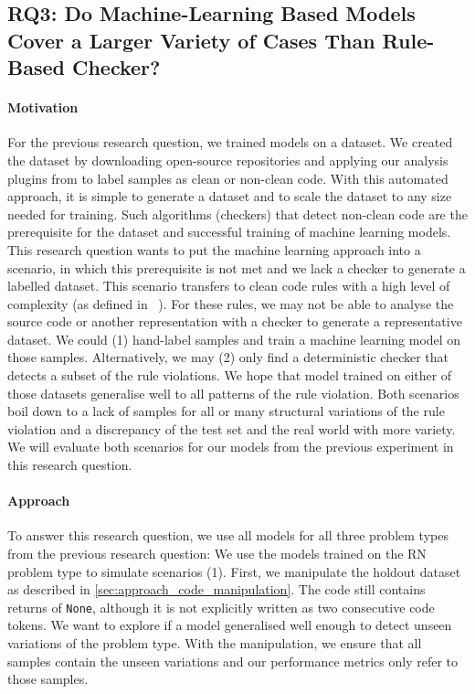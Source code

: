 \subsection{RQ3: Do Machine-Learning Based Models Cover a Larger Variety of Cases Than Rule-Based Checker? }\label{rq:3}

\paragraph{Motivation}
For the previous research question, we trained models on a dataset. We created the dataset by downloading open-source repositories and applying our analysis plugins from  to label samples as clean or non-clean code. With this automated approach, it is simple to generate a dataset and to scale the dataset to any size needed for training. Such algorithms (checkers) that detect non-clean code are the prerequisite for the dataset and successful training of machine learning models. This research question wants to put the machine learning approach into a scenario, in which this prerequisite is not met and we lack a checker to generate a labelled dataset. 
This scenario transfers to clean code rules with a high level of complexity (as defined in ~). For these rules, we may not be able to analyse the source code or another representation with a checker to generate a representative dataset. We could (1) hand-label samples and train a machine learning model on those samples. Alternatively, we may (2) only find a deterministic checker that detects a subset of the rule violations. We hope that model trained on either of those datasets generalise well to all patterns of the rule violation. Both scenarios boil down to a lack of samples for all or many structural variations of the rule violation and a discrepancy of the test set and the real world with more variety. We will evaluate both scenarios for our models from the previous experiment in this research question.


\paragraph{Approach}
To answer this research question, we use all models for all three problem types from the previous research question: 
We use the models trained on the RN problem type to simulate scenarios (1). First, we manipulate the holdout dataset as described in \ref{sec:approach_code_manipulation}. The code still contains returns of \texttt{None}, although it is not explicitly written as two consecutive code tokens. We want to explore if a model generalised well enough to detect unseen variations of the problem type. With the manipulation, we ensure that all samples contain the unseen variations and our performance metrics only refer to those samples. 

